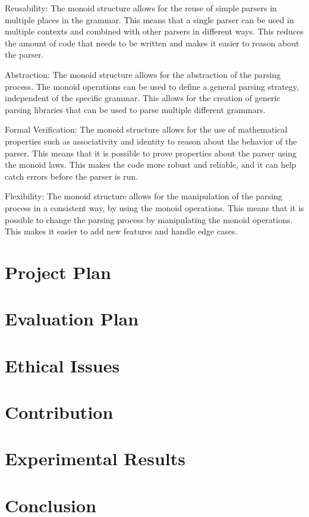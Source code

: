 \documentclass[12pt,twoside]{report}
\begin{document}
Reusability: The monoid structure allows for the reuse of simple parsers in multiple places in the grammar. This means that a single parser can be used in multiple contexts and combined with other parsers in different ways. This reduces the amount of code that needs to be written and makes it easier to reason about the parser.

Abstraction: The monoid structure allows for the abstraction of the parsing process. The monoid operations can be used to define a general parsing strategy, independent of the specific grammar. This allows for the creation of generic parsing libraries that can be used to parse multiple different grammars.

Formal Verification: The monoid structure allows for the use of mathematical properties such as associativity and identity to reason about the behavior of the parser. This means that it is possible to prove properties about the parser using the monoid laws. This makes the code more robust and reliable, and it can help catch errors before the parser is run.

Flexibility: The monoid structure allows for the manipulation of the parsing process in a consistent way, by using the monoid operations. This means that it is possible to change the parsing process by manipulating the monoid operations. This makes it easier to add new features and handle edge cases.
\chapter{Project Plan} 


\chapter{Evaluation Plan}

\chapter{Ethical Issues}

\chapter{Contribution}


\chapter{Experimental Results}


\chapter{Conclusion}



\end{document}
